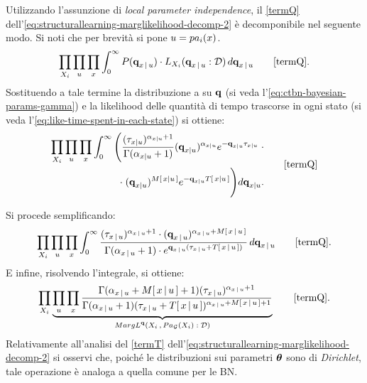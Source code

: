Utilizzando l'assunzione di \emph{local parameter independence}, il \autoref{termQ} dell'\autoref{eq:structurallearning-marglikelihood-decomp-2} è decomponibile nel seguente modo. Si noti che per brevità si pone $\mathnormal{u}=pa_i(\mathnormal{x})$.
\[
\prod_{\setel{X}_i} \prod_{\setel{u}} \prod_{\setel{x}} \int_0^\infty P(\param{q}_{\setel{x}\,\arrowvert\,\setel{u}}) \cdot L_{\setel{X}_i}(\param{q}_{\setel{x}\,\arrowvert\,\setel{u}}:\conceptsym{D}) \, d\param{q}_{\setel{x}\,\arrowvert\,\setel{u}} \tag*{\ref{termQ}} \text{.}
\]
Sostituendo a tale termine la distribuzione a  su $\boldsymbol{\textbf{\text{q}}}$ (si veda l'\autoref{eq:ctbn-bayesian-params-gamma}) e la likelihood delle quantità di tempo trascorse in ogni stato (si veda l'\autoref{eq:like-time-spent-in-each-state}) si ottiene: \\
\begin{align*}
\begin{split}
\prod_{\setel{X}_i} \prod_{\setel{u}} \prod_{\setel{x}} \int_0^\infty \Bigg( \frac{(\tau_{\setel{x}\arrowvert\setel{u}})^{\alpha_{\setel{x}\arrowvert\setel{u}}+1}}{\Gamma({\alpha_{\setel{x}\arrowvert\setel{u}}+1})} (\param{q}_{\setel{x}\arrowvert\setel{u}})^{\alpha_{\setel{x}\arrowvert\setel{u}}} e^{-\param{q}_{\setel{x}\arrowvert\setel{u}}\tau_{\setel{x}\arrowvert\setel{u}}} \; \cdot \\
\cdot \; (\param{q}_{x\arrowvert\setel{u}})^{\mstat{x\arrowvert\setel{u}}} e^{-\param{q}_{\setel{x}\arrowvert\setel{u}}\tstat{\setel{x}\arrowvert\setel{u}}} \Bigg) d\param{q}_{\setel{x}\arrowvert\setel{u}} \text{.}
\end{split}\tag*{\ref{termQ}}
\end{align*}

Si procede semplificando:
\[
\prod_{\setel{X}_i} \prod_{\setel{u}} \prod_{\setel{x}} \int_0^\infty \frac{(\tau_{\setel{x}\,\arrowvert\,\setel{u}})^{\alpha_{\setel{x}\,\arrowvert\,\setel{u}}+1} \cdot (\param{q}_{\setel{x}\,\arrowvert\,\setel{u}})^{\alpha_{\setel{x}\,\arrowvert\,\setel{u}}+\mstat{x\,\arrowvert\,\setel{u}}}}{\Gamma({\alpha_{\setel{x}\,\arrowvert\,\setel{u}}+1}) \cdot e^{\param{q}_{\setel{x}\,\arrowvert\,\setel{u}}(\tau_{\setel{x}\,\arrowvert\,\setel{u}}+\tstat{\setel{x}\,\arrowvert\,\setel{u}})}}  \, d\param{q}_{\setel{x}\,\arrowvert\,\setel{u}} \tag*{\ref{termQ}} \text{.}
\]
E infine, risolvendo l'integrale, si ottiene:
\[
\prod_{\setel{X}_i} \underbrace{\prod_{\setel{u}} \prod_{\setel{x}} \frac{\Gamma(\alpha_{\setel{x}\,\arrowvert\,\setel{u}}+\mstat{x\,\arrowvert\,\setel{u}}+1)(\tau_{\setel{x}\,\arrowvert\,\setel{u}})^{\alpha_{\setel{x}\,\arrowvert\,\setel{u}}+1}}{\Gamma(\alpha_{\setel{x}\,\arrowvert\,\setel{u}}+1)(\tau_{\setel{x}\,\arrowvert\,\setel{u}}+\tstat{\setel{x}\,\arrowvert\,\setel{u}})^{\alpha_{\setel{x}\,\arrowvert\,\setel{u}}+\mstat{x\,\arrowvert\,\setel{u}}+1}}}_\text{$MargL^{\param{q}}(\setel{X}_i\,,Pa_{\conceptsym{G}}(\setel{X}_i):\conceptsym{D})$} \tag*{\ref{termQ}} \text{.}
\]
Relativamente all'analisi del \autoref{termT} dell'\autoref{eq:structurallearning-marglikelihood-decomp-2} si osservi che, poiché le distribuzioni sui parametri $\boldsymbol{\textbf{\text{$\theta$}}}$ sono di \emph{Dirichlet}, tale operazione è analoga a quella comune per le \acl{BN}.

